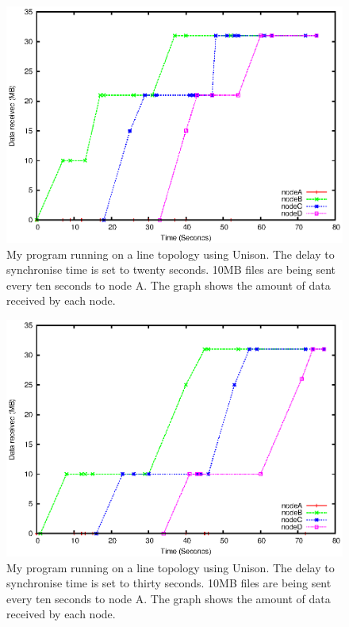 \documentclass[12pt]{article}
\begin{document}
\newpage
\begin{figure}[ht!]
\centering
\includegraphics[height=0.38\textheight]{images/line-uni-10-20.eps}
\caption{My program running on a line topology using Unison.
The delay to synchronise time is set to twenty seconds.
10MB files are being sent every ten seconds to node A. The graph
shows the amount of data received by each node.}
\label{fig:line_uni_10_20}
\end{figure}

\begin{figure}[hb!]
\centering
\includegraphics[height=0.38\textheight]{images/line-uni-10-30.eps}
\caption{My program running on a line topology using Unison.
The delay to synchronise time is set to thirty seconds.
10MB files are being sent every ten seconds to node A. The graph
shows the amount of data received by each node.}
\label{fig:line_uni_10_30}
\end{figure}
\newpage
\end{document}
